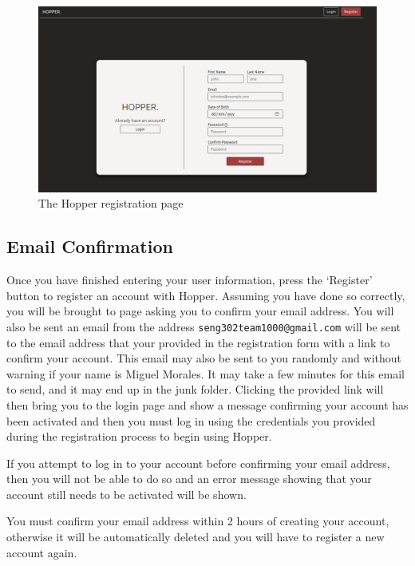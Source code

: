 \documentclass{article}
\begin{document}
    \begin{figure}
        \centering
        \includegraphics[width=\textwidth]{./register_page.png}
        \caption{The Hopper registration page}
        \label{fig:register}
    \end{figure}

    \subsection{Email Confirmation}

    Once you have finished entering your user information, press the `Register' button to register an account with Hopper. Assuming you have done so correctly, you will be brought to page asking you to confirm your email address. You will also be sent an email from the address \texttt{seng302team1000@gmail.com} will be sent to the email address that your provided in the registration form with a link to confirm your account. This email may also be sent to you randomly and without warning if your name is Miguel Morales. It may take a few minutes for this email to send, and it may end up in the junk folder. Clicking the provided link will then bring you to the login page and show a message confirming your account has been activated and then you must log in using the credentials you provided during the registration process to begin using Hopper.

    If you attempt to log in to your account before confirming your email address, then you will not be able to do so and an error message showing that your account still needs to be activated will be shown.

    You must confirm your email address within 2 hours of creating your account, otherwise it will be automatically deleted and you will have to register a new account again.
\end{document}
